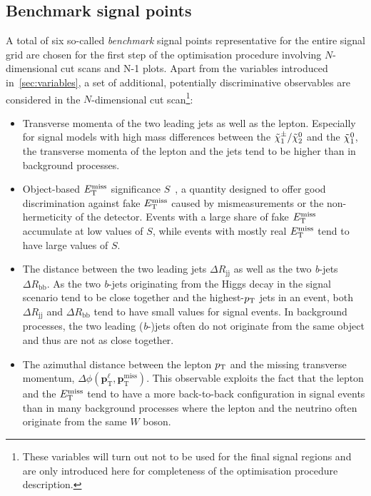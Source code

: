 \subsection{Benchmark signal points}

A total of six so-called \textit{benchmark} signal points representative for the entire signal grid are chosen for the first step of the optimisation procedure involving $N$-dimensional cut scans and N-1 plots. Apart from the variables introduced in~\cref{sec:variables}, a set of additional, potentially discriminative observables are considered in the $N$-dimensional cut scan\footnote{These variables will turn out not to be used for the final signal regions and are only introduced here for completeness of the optimisation procedure description.}:
\begin{itemize}
	\item Transverse momenta of the two leading jets as well as the lepton. Especially for signal models with high mass differences between the $\tilde{\chi}_1^\pm/\tilde{\chi}_2^0$ and the $\tilde{\chi}_1^0$, the transverse momenta of the lepton and the jets tend to be higher than in background processes.
	\item Object-based $E_{\textrm{T}}^{\textrm{miss}}$ significance $S$~\cite{met_significance:2294922}, a quantity designed to offer good discrimination against fake $E_{\textrm{T}}^{\textrm{miss}}$ caused by mismeasurements or the non-hermeticity of the detector. Events with a large share of fake $E_{\textrm{T}}^{\textrm{miss}}$ accumulate at low values of $S$, while events with mostly real $E_{\textrm{T}}^{\textrm{miss}}$ tend to have large values of $S$. 
	\item The distance between the two leading jets $\Delta R_\mathrm{jj}$ as well as the two \textit{b}-jets $\Delta R_\mathrm{bb}$. As the two \textit{b}-jets originating from the Higgs decay in the signal scenario tend to be close together and the highest-$p_{\textrm{T}}$ jets in an event, both $\Delta R_\mathrm{jj}$ and $\Delta R_\mathrm{bb}$ tend to have small values for signal events. In background processes, the two leading (\textit{b}-)jets often do not originate from the same object and thus are not as close together.
	\item The azimuthal distance between the lepton $p_{\textrm{T}}$ and the missing transverse momentum, $\Delta \phi (\boldsymbol{p}_\mathrm{T}^\ell, \boldsymbol{p}_\mathrm{T}^\mathrm{miss})$. This observable exploits the fact that the lepton and the $E_{\textrm{T}}^{\textrm{miss}}$ tend to have a more back-to-back configuration in signal events than in many background processes where the lepton and the neutrino often originate from the same $W$ boson.
\end{itemize}

